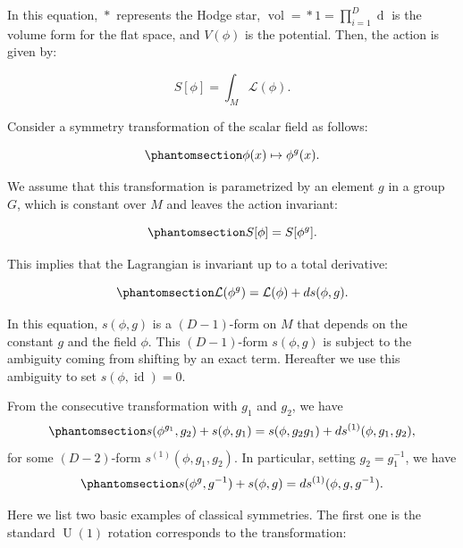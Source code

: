 \documentclass[
  letterpaper,
  DIV=11,
  numbers=noendperiod]{scrreport}
\DeclareMathOperator{\vol}{vol}
\DeclareMathOperator{\U}{U}
\DeclareMathOperator{\id}{id}
\newcommand{\stdim}{D}
\begin{document}
In this equation, \(\mathop{*}\) represents the Hodge star,
\(\vol = \mathop{*} 1 = \prod_{i=1}^{\stdim} \mathop{dx_i}\) is the
volume form for the flat space, and \(V(\phi)\) is the potential. Then,
the action is given by:

\[
S[\phi] = \int_{M}\mathcal{L}(\phi).
\]

Consider a symmetry transformation of the scalar field as follows:

\begin{equation}\phantomsection\label{eq-scalar-transf}{
\phi(x) \mapsto \phi^g(x).
}\end{equation}

We assume that this transformation is parametrized by an element \(g\)
in a group \(G\), which is constant over \(M\) and leaves the action
invariant:

\begin{equation}\phantomsection\label{eq-action-inv}{
S[\phi]=S[\phi^g].
}\end{equation}

This implies that the Lagrangian is invariant up to a total derivative:

\begin{equation}\phantomsection\label{eq-Lagrangian-inv}{
\mathcal{L}(\phi^g) = \mathcal{L}(\phi) + \mathop{ds}(\phi,g).
}\end{equation}

In this equation, \(s(\phi,g)\) is a \((\stdim-1)\)-form on \(M\) that
depends on the constant \(g\) and the field \(\phi\). This
\((D-1)\)-form \(s(\phi,g)\) is subject to the ambiguity coming from
shifting by an exact term. Hereafter we use this ambiguity to set
\(s(\phi,\id)=0\).

From the consecutive transformation with \(g_1\) and \(g_2\), we have
\begin{equation}\phantomsection\label{eq-surface-term-assosiative}{ 
s(\phi^{g_1},g_2) + s(\phi,g_1) = s(\phi,g_2g_1) + ds^{(1)}(\phi,g_1,g_2),
}\end{equation} for some \((D-2)\)-form \(s^{(1)}(\phi,g_1,g_2)\). In
particular, setting \(g_2=g_1^{-1}\), we have
\begin{equation}\phantomsection\label{eq-surface-term-inverse}{s(\phi^g,g^{-1}) + s(\phi,g)  = ds^{(1)}(\phi, g, g^{-1}).
}\end{equation}

Here we list two basic examples of classical symmetries. The first one
is the standard \(\U(1)\) rotation corresponds to the transformation:
\end{document}
